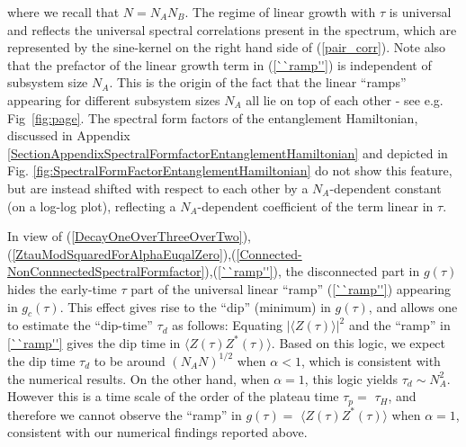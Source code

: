 \documentclass[aps,prb,preprint,onecolumn,amsmath,amssymb,superscriptaddress,eqsecnum,floatfix,scrartcl]{revtex4-1}
\begin{document}
where  we recall that 
$N=N_AN_B$. 
The regime of linear growth  with $\tau$ is universal and reflects the 
universal 
spectral
correlations present   in the spectrum, which are represented by the sine-kernel 
on the right hand side of  (\ref{pair_corr}).
Note also that the prefactor of the linear growth term in (\ref{``ramp''})  is independent of subsystem size $N_A$. This is the origin of the fact
that
the  linear ``ramps'' appearing  for different subsystem sizes $N_A$ all lie on top of each other - see e.g. Fig\
\ref{fig:page}. The spectral form factors of the entanglement Hamiltonian,
discussed in Appendix  \ref{SectionAppendixSpectralFormfactorEntanglementHamiltonian}
and   depicted in Fig. \ref{fig:SpectralFormFactorEntanglementHamiltonian} do not show this feature, but are instead
shifted with respect to each other by a $N_A$-dependent constant (on a log-log plot), reflecting a $N_A$-dependent
coefficient of the term linear in $\tau$.






In view of (\ref{DecayOneOverThreeOverTwo}),(\ref{ZtauModSquaredForAlphaEuqalZero}),(\ref{Connected-NonConnnectedSpectralFormfactor}),(\ref{``ramp''}), the disconnected part in $g(\tau)$ hides
the early-time $\tau$ part of
the universal  linear ``ramp''  (\ref{``ramp''}) appearing in $g_c(\tau)$. This effect
gives rise to the ``dip'' (minimum) in $g(\tau)$, and allows one to estimate the ``dip-time'' $\tau_d$ as follows:
Equating $|\langle Z(\tau)\rangle|^2$ and the ``ramp'' in \eqref{``ramp''} gives the dip time in $\langle Z(\tau)Z^*(\tau)\rangle$. 
Based on this logic, 
we expect  the dip time $\tau_d$ to be around $(N_AN)^{1/2}$
when $\alpha<1$, which is consistent with the numerical results. On the other hand, when $\alpha=1$,
this logic yields
$\tau_d\sim N_A^2$. However this 
is a time scale of the order of
the plateau time $\tau_p=$ $\tau_H$, and therefore we cannot observe the ``ramp'' in $g(\tau)=$ $\langle Z(\tau)Z^*(\tau)\rangle$ when $\alpha=1$, consistent with our numerical findings reported above.
\end{document}
